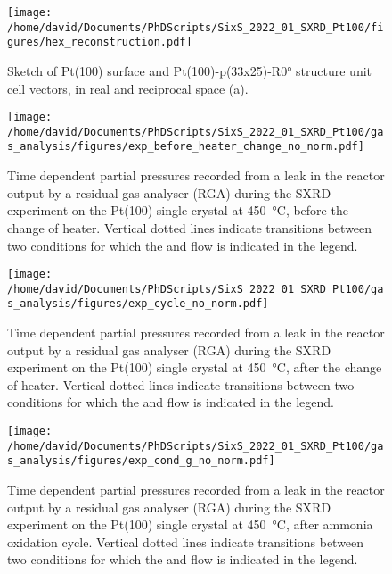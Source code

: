 
\begin{figure}[!htb]
    \centering
    \texttt{[image: /home/david/Documents/PhDScripts/SixS\_2022\_01\_SXRD\_Pt100/figures/hex\_reconstruction.pdf]}
    \caption{
    Sketch of Pt(100) surface and Pt(100)-p(33x25)-R\ang{0} structure unit cell vectors, in real and reciprocal space (a).
    }
    \label{fig:Pt100UnitCellsReconstruction}
\end{figure}

\begin{figure}[!htb]
    \centering
    \texttt{[image: /home/david/Documents/PhDScripts/SixS\_2022\_01\_SXRD\_Pt100/gas\_analysis/figures/exp\_before\_heater\_change\_no\_norm.pdf]}
    \caption{
        Time dependent partial pressures recorded from a leak in the reactor output by a residual gas analyser (RGA) during the SXRD experiment on the Pt(100) single crystal at \qty{450}{\degreeCelsius}, before the change of heater.
        Vertical dotted lines indicate transitions between two conditions for which the  and  flow is indicated in the legend.
    }
    \label{fig:RGA450Pt100BeforeHeaterChange}
\end{figure}

\begin{figure}[!htb]
    \centering
    \texttt{[image: /home/david/Documents/PhDScripts/SixS\_2022\_01\_SXRD\_Pt100/gas\_analysis/figures/exp\_cycle\_no\_norm.pdf]}
    \caption{
        Time dependent partial pressures recorded from a leak in the reactor output by a residual gas analyser (RGA) during the SXRD experiment on the Pt(100) single crystal at \qty{450}{\degreeCelsius}, after the change of heater.
        Vertical dotted lines indicate transitions between two conditions for which the  and  flow is indicated in the legend.
    }
    \label{fig:RGA450Pt100Cycle}
\end{figure}

\begin{figure}[!htb]
    \centering
    \texttt{[image: /home/david/Documents/PhDScripts/SixS\_2022\_01\_SXRD\_Pt100/gas\_analysis/figures/exp\_cond\_g\_no\_norm.pdf]}
    \caption{
        Time dependent partial pressures recorded from a leak in the reactor output by a residual gas analyser (RGA) during the SXRD experiment on the Pt(100) single crystal at \qty{450}{\degreeCelsius}, after ammonia oxidation cycle.
        Vertical dotted lines indicate transitions between two conditions for which the  and  flow is indicated in the legend.
    }
    \label{fig:RGA450Pt100CondG}
\end{figure}